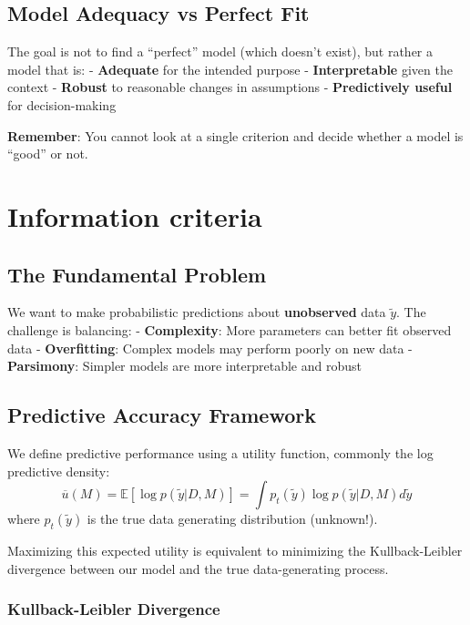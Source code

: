 \documentclass[
  letterpaper,
  DIV=11,
  numbers=noendperiod]{scrreprt}
\begin{document}
\subsection{Model Adequacy vs Perfect
Fit}\label{model-adequacy-vs-perfect-fit}

The goal is not to find a ``perfect'' model (which doesn't exist), but
rather a model that is: - \textbf{Adequate} for the intended purpose -
\textbf{Interpretable} given the context - \textbf{Robust} to reasonable
changes in assumptions - \textbf{Predictively useful} for
decision-making

\textbf{Remember}: You cannot look at a single criterion and decide
whether a model is ``good'' or not.

\section{Information criteria}\label{information-criteria}

\subsection{The Fundamental Problem}\label{the-fundamental-problem}

We want to make probabilistic predictions about \textbf{unobserved} data
\(\tilde{y}\). The challenge is balancing: - \textbf{Complexity}: More
parameters can better fit observed data - \textbf{Overfitting}: Complex
models may perform poorly on new data - \textbf{Parsimony}: Simpler
models are more interpretable and robust

\subsection{Predictive Accuracy
Framework}\label{predictive-accuracy-framework}

We define predictive performance using a utility function, commonly the
log predictive density: \[
\overline{u}(M) = \mathbb{E}[\log p(\tilde{y} | D, M)] = \int p_t(\tilde{y}) \log p(\tilde{y} | D, M) d\tilde{y}
\] where \(p_t(\tilde{y})\) is the true data generating distribution
(unknown!).

Maximizing this expected utility is equivalent to minimizing the
Kullback-Leibler divergence between our model and the true
data-generating process.

\subsubsection{Kullback-Leibler
Divergence}\label{kullback-leibler-divergence}
\end{document}
